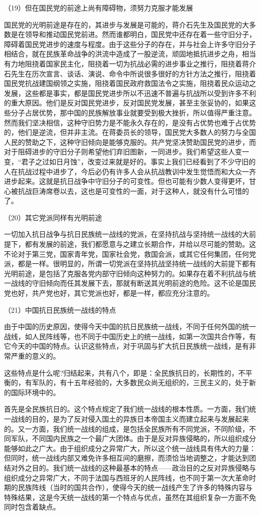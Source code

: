 \documentclass[UTF8, 12pt, a4paper]{ctexrep}
\begin{document}
（19）但在国民党的前途上尚有障碍物，须努力克服才能发展

国民党的光明前途是存在的，其进步与发展是可能的，蒋介石先生及国民党的大多数是在领导和推动国民党前进。然而谁都明白，国民党中还存在着一些守旧分子，障碍着国民党进步的速度与程度。由于这些分子的存在，并与社会上许多守旧分子相结合，就在民族革命战争的洪流中造成了一股逆流，顽固地抵抗进步之舟，相当有力地阻挠着国家民主化，阻挠着一切为抗战必需的进步事业之推行，阻挠着蒋介石先生在历次宣言、谈话、演说、命令中所说很多很好的方针方法之推行，阻挠着国民党抗战建国纲领之实施，阻挠着国民政府救国法令之实施，阻挠着民众运动之发展，这些都是事实，都是国民党进步所以不迅速不普遍与抗战所以受到许多不利的重大原因。他们是反对国民党进步，反对国民党发展，甚至主张妥协的，如果这些分子占居优势，那中国的民族解放事业就要受到极大挫折，所以值得严重注意。然而我们坚决相信，这种守旧势力是不能永久存在的，是没有占优势也难于占优势的，他们是逆流，但并非主流。在蒋委员长的领导，国民党大多数人的努力与全国人民的赞助之下，这种守旧倾向是能够克服的。共产党坚决赞助国民党的进步，而对于阻碍进步的守旧分子则希望他们弃旧图新，一同进步。我们希望这些人变一变，“君子之过如日月蚀”，改变过来就是好的。事实上我们已经看到了不少守旧的人在抗战过程中进步了，今后必仍有许多人会从抗战教训中发生觉悟而和大众一齐进步起来。这就是抗日战争中守旧分子的可变性。但也可能有少数人变得更坏，甘心被抗战巨涛席卷以去，这也是可变性的一面，对于这种人，就没有什么可惜的了。

（20）其它党派同样有光明前途

一切加入抗日战争与抗日民族统一战线的党派，在坚持抗战与坚持统一战线的大前提下，都有发展的前途，我们都愿意与之建立长期合作，并给以尽可能的赞助。这不论对于第三党，国家青年党，国家社会党，救国会派，或其它任何集团，任何党派，都是一样。很明显的，所谓一切党派在坚持抗战坚持统一战线的大前提下都有光明前途，是包括了克服各党内部守旧倾向这种努力的。如果存在着不利抗战与统一战线的守旧倾向而任其发展下去，那就有断送其光明前途的危险。这不论是国民党也好，共产党也好，其它党派也好，都是一样，都应充分注意的。

（21）中国抗日民族统一战线的特点

由于中国的历史原因，使得今天中国的抗日民族统一战线，不同于任何外国的统一战线，如人民阵线等，也不同于中国历史上的统一战线，如第一次国共合作等，有它今天的中国的特点。认识这些特点，对于巩固与扩大抗日民族统一战线，是有非常严重的意义的。

这些特点是什么呢?归结起来，共有八个，即是：全民族抗日的，长期性的，不平衡的，有军队的，有十五年经验的，大多数民众尚无组织的，三民主义的，处于新的国际环境中的。

首先是全民族抗日的。这个特点规定了我们统一战线的根本性质。一方面，我们统一战线的目的，是为了反对侵入国土的异族日本帝国主义而建立起来与发展起来的。又一方面，我们统一战线的组成，是包括全民族所有不同党派，不同阶级，不同军队，不同国内民族之一个最广大团体。由于是反对异族侵略的，所以组织成分能够如此之广大。由于组织成分之异常广大，所以这个统一战线具有伟大的力量：但同时，统一战线内部又难免许多相互间的磨擦，而须恰当地调整之，才能达到团结对外之目的。我们统一战线的这种最基本的特点——政治目的之反对异族侵略与组织成分之异常广大，不同于法国与西班牙的人民阵线，也不同于第一次大革命时期的民族阵线（当时的国共合作），使得今天的统一战线产生了许多的特殊内容与特殊结果，这是今天统一战线的第一个特点与优点，虽然在其组织复杂一方面不免同时包含着缺点。
\end{document}
